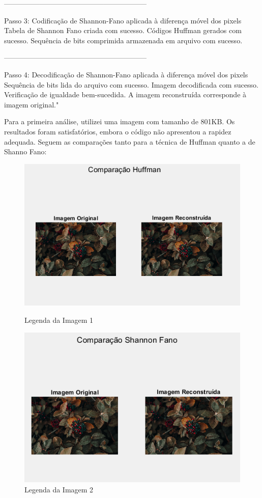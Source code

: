 \documentclass{article}
\begin{document}
------------------------------------------------------------

Passo 3: Codificação de Shannon-Fano aplicada à diferença móvel dos pixels
Tabela de Shannon Fano criada com sucesso.
Códigos Huffman gerados com sucesso.
Sequência de bits comprimida armazenada em arquivo com sucesso.

------------------------------------------------------------

Passo 4: Decodificação de Shannon-Fano aplicada à diferença móvel dos pixels
Sequência de bits lida do arquivo com sucesso.
Imagem decodificada com sucesso.
Verificação de igualdade bem-sucedida. A imagem reconstruída corresponde à imagem original."

Para a primeira análise, utilizei uma imagem com tamanho de 801KB. Os resultados foram satisfatórios, embora o código não apresentou a rapidez adequada. Seguem as comparações tanto para a técnica de Huffman quanto a de Shanno Fano:

\begin{figure}[ht]
\begin{minipage}{0.5\textwidth}
  \centering
  \includegraphics[width=\linewidth]{Captura de Tela (46).png}
  \caption{Legenda da Imagem 1}
\end{minipage}%
\begin{minipage}{0.5\textwidth}
  \centering
  \includegraphics[width=\linewidth]{Captura de Tela (47).png}
  \caption{Legenda da Imagem 2}
\end{minipage}
\end{figure}
\end{document}
